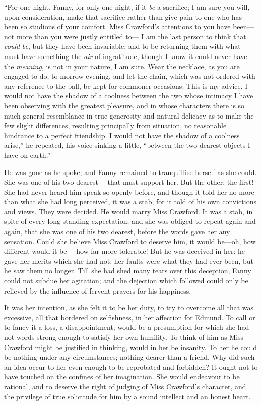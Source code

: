 \documentclass{article}
\begin{document}
``For one night, Fanny, for only one night, if it \emph{be}
a sacrifice; I am sure you will, upon consideration,
make that sacrifice rather than give pain to one who has been
so studious of your comfort.  Miss Crawford's attentions
to you have been---not more than you were justly entitled to---%
I am the last person to think that \emph{could} \emph{be},
but they have been invariable; and to be returning them
with what must have something the \emph{air} of ingratitude,
though I know it could never have the \emph{meaning}, is not
in your nature, I am sure.  Wear the necklace, as you
are engaged to do, to-morrow evening, and let the chain,
which was not ordered with any reference to the ball,
be kept for commoner occasions.  This is my advice.
I would not have the shadow of a coolness between the two whose
intimacy I have been observing with the greatest pleasure,
and in whose characters there is so much general resemblance
in true generosity and natural delicacy as to make the few
slight differences, resulting principally from situation,
no reasonable hindrance to a perfect friendship.  I would
not have the shadow of a coolness arise,'' he repeated,
his voice sinking a little, ``between the two dearest objects
I have on earth.''

He was gone as he spoke; and Fanny remained to tranquillise
herself as she could.  She was one of his two dearest---%
that must support her.  But the other:  the first!
She had never heard him speak so openly before, and though
it told her no more than what she had long perceived,
it was a stab, for it told of his own convictions and views.
They were decided.  He would marry Miss Crawford.
It was a stab, in spite of every long-standing expectation;
and she was obliged to repeat again and again, that she
was one of his two dearest, before the words gave
her any sensation.  Could she believe Miss Crawford to
deserve him, it would be---oh, how different would it be---%
how far more tolerable!  But he was deceived in her:
he gave her merits which she had not; her faults were
what they had ever been, but he saw them no longer.
Till she had shed many tears over this deception,
Fanny could not subdue her agitation; and the dejection
which followed could only be relieved by the influence of
fervent prayers for his happiness.

It was her intention, as she felt it to be her duty,
to try to overcome all that was excessive, all that
bordered on selfishness, in her affection for Edmund.
To call or to fancy it a loss, a disappointment, would be
a presumption for which she had not words strong enough to
satisfy her own humility.  To think of him as Miss Crawford
might be justified in thinking, would in her be insanity.
To her he could be nothing under any circumstances;
nothing dearer than a friend.  Why did such an idea occur
to her even enough to be reprobated and forbidden?  It ought
not to have touched on the confines of her imagination.
She would endeavour to be rational, and to deserve
the right of judging of Miss Crawford's character,
and the privilege of true solicitude for him by a sound
intellect and an honest heart.
\end{document}
